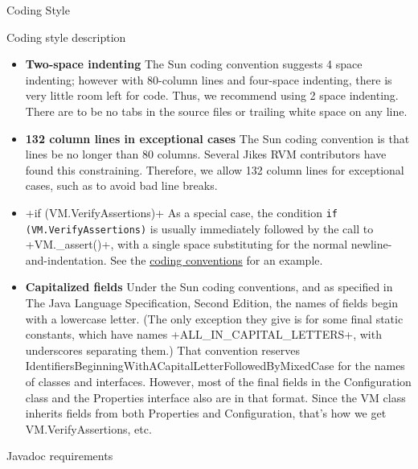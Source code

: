 \begin{section}{Coding Style}
\begin{subsection}{Coding style description}
\begin{itemize}
  \item \textbf{Two-space indenting} The Sun coding convention suggests 4 space indenting; however with 80-column lines and four-space indenting, there is very little room left for code. Thus, we recommend using 2 space indenting. There are to be no tabs in the source files or trailing white space on any line.
  \item \textbf{132 column lines in exceptional cases} The Sun coding convention is that lines be no longer than 80 columns. Several Jikes RVM contributors have found this constraining. Therefore, we allow 132 column lines for exceptional cases, such as to avoid bad line breaks.
  \item \spverb+if (VM.VerifyAssertions)+ As a special case, the condition \texttt{if \newline (VM.VerifyAssertions)} is usually immediately followed by the call to \spverb+VM._assert()+, with a single space substituting for the normal newline-and-indentation. See the \hyperref[sec:codingconventions]{coding conventions} for an example.
  \item \textbf{Capitalized fields} Under the Sun coding conventions, and as specified in The Java Language Specification, Second Edition, the names of fields begin with a lowercase letter. (The only exception they give is for some final static constants, which have names \spverb+ALL_IN_CAPITAL_LETTERS+, with underscores separating them.) That convention reserves IdentifiersBeginningWithACapitalLetterFollowedByMixedCase for the names of classes and interfaces. However, most of the final fields in the Configuration class and the Properties interface also are in that format. Since the VM class inherits fields from both Properties and Configuration, that's how we get VM.VerifyAssertions, etc.
\end{itemize}

\end{subsection}

\begin{subsection}{Javadoc requirements}


\end{subsection}
\end{section}
